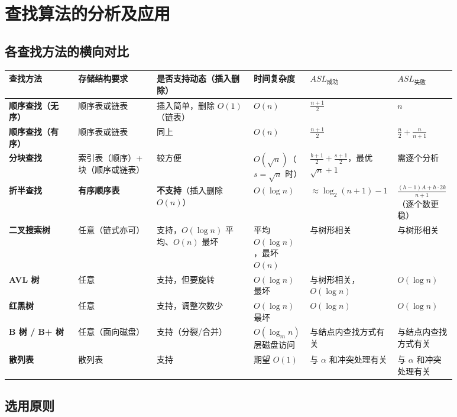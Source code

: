 \documentclass[11pt,openany,UTF8]{ctexbook}
\begin{document}
\section{查找算法的分析及应用}

\subsection{各查找方法的横向对比}

\begingroup\small\setlength{\tabcolsep}{4.0pt}
\begin{longtable}{@{}L{0.1518\linewidth}L{0.1771\linewidth}L{0.2108\linewidth}L{0.1124\linewidth}L{0.1124\linewidth}L{0.1124\linewidth}@{}}
\toprule
\textbf{查找方法} & \textbf{存储结构要求} & \textbf{是否支持动态（插入删除）} & \textbf{时间复杂度} & \textbf{$ASL_{成功}$} & \textbf{$ASL_{失败}$} \\
\midrule
\endhead
\textbf{顺序查找（无序）} & 顺序表或链表 & 插入简单，删除 $O(1)$（链表） & $O(n)$ & $\frac{n+1}{2}$ & $n$ \\
\textbf{顺序查找（有序）} & 顺序表或链表 & 同上 & $O(n)$ & $\frac{n+1}{2}$ & $\frac{n}{2}+\frac{n}{n+1}$ \\
\textbf{分块查找} & 索引表（顺序）+ 块（顺序或链表） & 较方便 & $O(\sqrt{n})$（$s=\sqrt n$ 时） & $\frac{b+1}{2}+\frac{s+1}{2}$，最优 $\sqrt{n}+1$ & 需逐个分析 \\
\textbf{折半查找} & \textbf{有序顺序表} & \textbf{不支持}（插入删除 $O(n)$） & $O(\log n)$ & $\approx\log_2(n+1)-1$ & $\frac{(h-1)A+h\cdot 2k}{n+1}$（逐个数更稳） \\
\textbf{二叉搜索树} & 任意（链式亦可） & 支持，$O(\log n)$ 平均、$O(n)$ 最坏 & 平均 $O(\log n)$，最坏 $O(n)$ & 与树形相关 & 与树形相关 \\
\textbf{AVL 树} & 任意 & 支持，但要旋转 & $O(\log n)$ 最坏 & 与树形相关，$O(\log n)$ & $O(\log n)$ \\
\textbf{红黑树} & 任意 & 支持，调整次数少 & $O(\log n)$ 最坏 & $O(\log n)$ & $O(\log n)$ \\
\textbf{B 树 / B+ 树} & 任意（面向磁盘） & 支持（分裂/合并） & $O(\log_m n)$ 层磁盘访问 & 与结点内查找方式有关 & 与结点内查找方式有关 \\
\textbf{散列表} & 散列表 & 支持 & 期望 $O(1)$ & 与 $\alpha$ 和冲突处理有关 & 与 $\alpha$ 和冲突处理有关 \\
\bottomrule
\end{longtable}
\endgroup

\subsection{选用原则}
\end{document}
